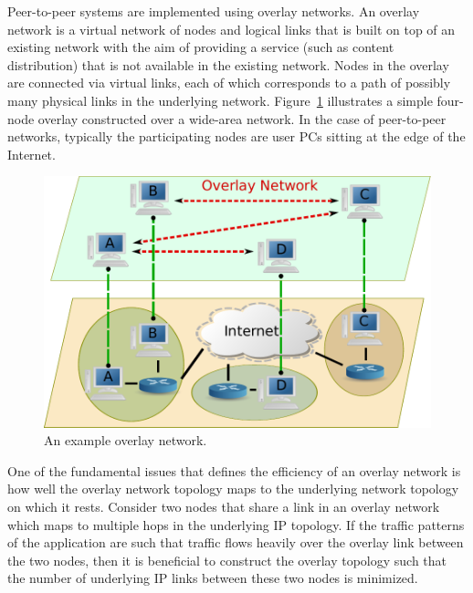 Peer-to-peer systems are implemented using overlay networks.   
An overlay network is a virtual network of nodes and logical links 
that is built on top of an existing network with the aim of providing 
a service (such as content distribution) that is not available 
in the existing network.  Nodes in the overlay are connected via virtual 
links, each of which corresponds to a path of possibly many physical 
links in the underlying network.  
Figure~\ref{figure:overlay}
illustrates a simple four-node overlay constructed over a wide-area network.
In the case of peer-to-peer networks, typically the participating nodes
are user PCs sitting at the edge of the Internet.

\begin{figure}
\centering
  \includegraphics[scale=0.5]{img/p2p.pdf}
\caption{An example overlay network.}
\label{figure:overlay}
\end{figure}

One of the fundamental issues that defines the efficiency of an overlay 
network is how 
well the overlay network topology maps to the underlying network topology on which it rests.
Consider two nodes that share a link in an overlay network which maps to multiple 
hops in the underlying IP topology.  If the traffic patterns of the application are such
that traffic flows heavily over the overlay link between the two nodes, then it is
beneficial to construct the overlay topology such that the number of underlying IP links
between these two nodes is minimized.   

